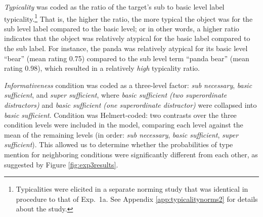 \documentclass[11pt]{article}
\newcommand{\figref}[1]{Figure \ref{#1}}
\newcommand{\appref}[1]{Appendix \ref{#1}}
\begin{document}
\emph{Typicality} was coded as the ratio of the target's sub to basic level label typicality.\footnote{Typicalities were elicited in a separate norming study that was identical in procedure to that of Exp.~1a. See \appref{app:typicalitynorms2} for details about the study.} That is, the higher the ratio, the more typical the object was for the sub level label compared to the basic level; or in other words, a higher ratio indicates that the object was relatively atypical for the basic label compared to the sub label. For instance, the panda was relatively atypical for its basic level ``bear'' (mean rating 0.75) compared to the sub level term ``panda bear'' (mean rating 0.98), which resulted in a relatively \emph{high} typicality ratio.

\emph{Informativeness} condition was coded as a three-level factor: \emph{sub necessary}, \emph{basic sufficient}, and \emph{super sufficient}, where \emph{basic sufficient (two superordinate distractors)} and \emph{basic sufficient (one superordinate distractor)} were collapsed into \emph{basic sufficient}. Condition was Helmert-coded: two contrasts over the three condition levels were included in the model, comparing each level against the mean of the remaining levels (in order: \emph{sub necessary}, \emph{basic sufficient}, \emph{super sufficient}). This allowed us to determine whether the probabilities of type mention  for neighboring conditions were significantly different from each other, as suggested by \figref{fig:exp3results}.

%
\end{document}
